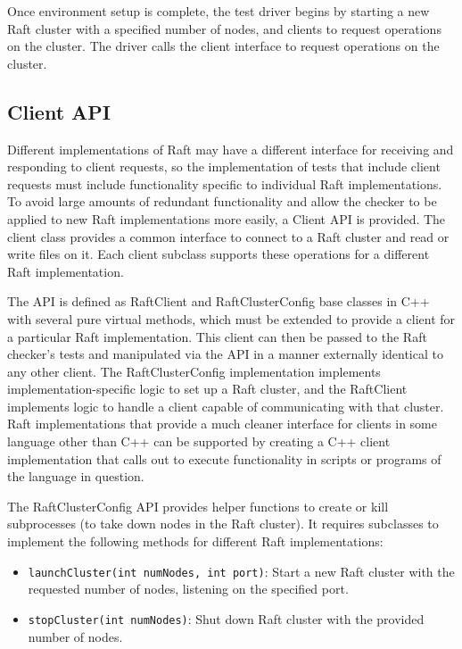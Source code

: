 \documentclass[UTF8]{article}
\begin{document}
Once environment setup is complete, the test driver begins by starting a new Raft cluster with a specified number of nodes, and clients to request operations on the cluster. The driver calls the client interface to request operations on the cluster.

\subsection{Client API}

Different implementations of Raft may have a different interface for receiving and responding to client requests, so the implementation of tests that include client requests must include functionality specific to individual Raft implementations. To avoid large amounts of redundant functionality and allow the checker to be applied to new Raft implementations more easily, a Client API is provided. The client class provides a common interface to connect to a Raft cluster and read or write files on it. Each client subclass supports these operations for a different Raft implementation.

The API is defined as RaftClient and RaftClusterConfig base classes in C++ with several pure virtual methods, which must be extended to provide a client for a particular Raft implementation. This client can then be passed to the Raft checker's tests and manipulated via the API in a manner externally identical to any other client. The RaftClusterConfig implementation implements implementation-specific logic to set up a Raft cluster, and the RaftClient implements logic to handle a client capable of communicating with that cluster. Raft implementations that provide a much cleaner interface for clients in some language other than C++ can be supported by creating a C++ client implementation that calls out to execute functionality in scripts or programs of the language in question.

The RaftClusterConfig API provides helper functions to create or kill subprocesses (to take down nodes in the Raft cluster). It requires subclasses to implement the following methods for different Raft implementations:

\begin{itemize}
\item \texttt{launchCluster(int numNodes, int port)}: Start a new Raft cluster with the requested number of nodes, listening on the specified port.
\item \texttt{stopCluster(int numNodes)}: Shut down Raft cluster with the provided number of nodes.
\end{itemize}
\end{document}
